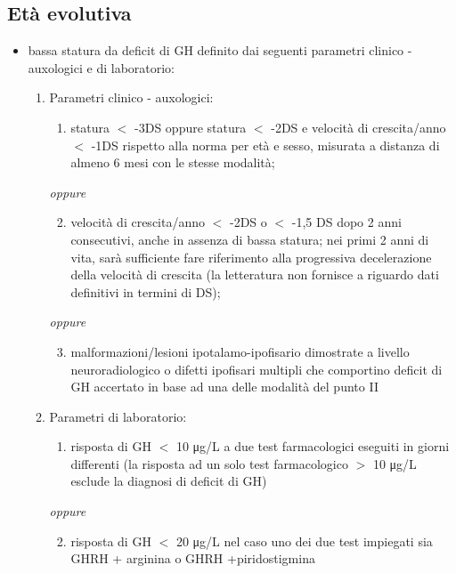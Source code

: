 \subsection*{Et\`a evolutiva}
\begin{itemize}
\item 	bassa statura da deficit di GH definito dai seguenti parametri clinico - auxologici e di laboratorio:
	\begin{enumerate}
	\renewcommand{\theenumi}{\Roman{enumi}:}
	\renewcommand{\labelenumi}{\theenumi}
	\renewcommand{\theenumii}{\alph{enumii})}
	\renewcommand{\labelenumii}{\theenumii}
	\item Parametri clinico - auxologici:
		\begin{enumerate}
			\item 	statura $<$ -3DS oppure statura $<$ -2DS e velocit\`a di crescita/anno $<$ -1DS rispetto alla norma per et\`a e
				sesso, misurata a distanza di almeno 6 mesi con le stesse modalit\`a;
		\end{enumerate}
		\textit{oppure}
		\begin{enumerate}
			\setcounter{enumii}{1}
			\item 	velocit\`a di crescita/anno $<$ -2DS o $<$ -1,5 DS dopo 2 anni consecutivi, anche in assenza di bassa statura;
				nei primi 2 anni di vita, sar\`a sufficiente fare riferimento alla progressiva decelerazione della velocit\`a di
				crescita (la letteratura non fornisce a riguardo dati definitivi in termini di DS);
		\end{enumerate}
		\textit{oppure}
		\begin{enumerate}
			\setcounter{enumii}{2}
			\item 	malformazioni/lesioni ipotalamo-ipofisario dimostrate a livello neuroradiologico o difetti ipofisari
				multipli che comportino deficit di GH accertato in base ad una delle modalit\`a del punto II
		\end{enumerate}
	\item Parametri di laboratorio:
		\begin{enumerate}
			\setcounter{enumii}{0}
			\item 	risposta di GH $<$ 10 \unit{\micro g}/L a due test farmacologici eseguiti in giorni differenti (la risposta ad un solo test
				farmacologico $>$ 10 \unit{\micro g}/L esclude la diagnosi di deficit di GH) 	
		\end{enumerate}
		\textit{oppure}
		\begin{enumerate}
			\setcounter{enumii}{1}
			\item 	risposta di GH $<$ 20 \unit{\micro g}/L nel caso uno dei due test impiegati sia GHRH + arginina o GHRH
				+piridostigmina
		\end{enumerate}
	\end{enumerate}
\end{itemize}

